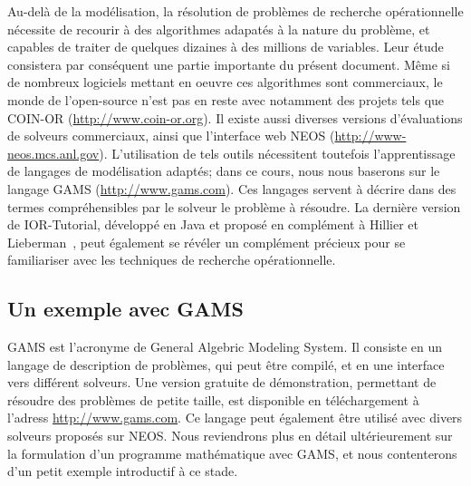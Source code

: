 Au-delà de la modélisation, la résolution de problèmes de recherche opérationnelle nécessite de recourir à des algorithmes adapatés à la nature du problème, et capables de traiter de quelques dizaines à des millions de variables.
Leur étude consistera par conséquent une partie importante du présent document.
Même si de nombreux logiciels mettant en oeuvre ces algorithmes sont commerciaux, le monde de l'open-source n'est pas en reste avec notamment des projets tels que COIN-OR (\url{http://www.coin-or.org}). Il existe aussi diverses versions d'évaluations de solveurs commerciaux, ainsi que l'interface web NEOS (\url{http://www-neos.mcs.anl.gov}).
L'utilisation de tels outils nécessitent toutefois l'apprentissage de langages de modélisation adaptés; dans ce cours, nous nous baserons sur le langage GAMS (\url{http://www.gams.com}).
Ces langages servent à décrire dans des termes compréhensibles par le solveur le problème à résoudre.
La dernière version de IOR-Tutorial, développé en Java et proposé en complément à Hillier et Lieberman~\cite{HillLieb01}, peut également se révéler un complément précieux pour se familiariser avec les techniques de recherche opérationnelle.

\subsection{Un exemple avec GAMS}

GAMS est l'acronyme de General Algebric Modeling System.
Il consiste en un langage de description de problèmes, qui peut être compilé, et en une interface vers différent solveurs.
Une version gratuite de démonstration, permettant de résoudre des problèmes de petite taille, est disponible en téléchargement à l'adress \url{http://www.gams.com}.
Ce langage peut également être utilisé avec divers solveurs proposés sur NEOS.
Nous reviendrons plus en détail ultérieurement sur la formulation d'un programme mathématique avec GAMS, et nous contenterons d'un petit exemple introductif à ce stade.

